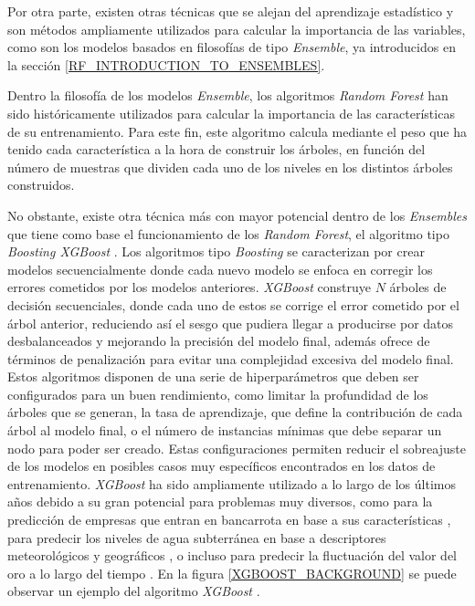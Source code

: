 
Por otra parte, existen otras técnicas que se alejan del aprendizaje estadístico y son métodos ampliamente utilizados para calcular la importancia de las variables, como son los modelos basados en filosofías de tipo \textit{Ensemble}, ya introducidos en la sección \ref{RF_INTRODUCTION_TO_ENSEMBLES}.

Dentro la filosofía de los modelos \textit{Ensemble}, los algoritmos \textit{Random Forest} han sido históricamente utilizados para calcular la importancia de las características de su entrenamiento. Para este fin, este algoritmo calcula mediante el peso que ha tenido cada característica a la hora de construir los árboles, en función del número de muestras que dividen cada uno de los niveles en los distintos árboles construidos.

No obstante, existe otra técnica más con mayor potencial dentro de los \textit{Ensembles} que tiene como base el funcionamiento de los \textit{Random Forest}, el algoritmo tipo \textit{Boosting XGBoost} \cite{Chen_2016}. Los algoritmos tipo \textit{Boosting} se caracterizan por crear modelos secuencialmente donde cada nuevo modelo se enfoca en corregir los errores cometidos por los modelos anteriores. \textit{XGBoost} construye $N$ árboles de decisión secuenciales, donde cada uno de estos se corrige el error cometido por el árbol anterior, reduciendo así el sesgo que pudiera llegar a producirse por datos desbalanceados y mejorando la precisión del modelo final, además ofrece de términos de penalización para evitar una complejidad excesiva del modelo final. Estos algoritmos disponen de una serie de hiperparámetros que deben ser configurados para un buen rendimiento, como limitar la profundidad de los árboles que se generan, la tasa de aprendizaje, que define la contribución de cada árbol al modelo final, o el número de instancias mínimas que debe separar un nodo para poder ser creado. Estas configuraciones permiten reducir el sobreajuste de los modelos en posibles casos muy específicos encontrados en los datos de entrenamiento. \textit{XGBoost} ha sido ampliamente utilizado a lo largo de los últimos años debido a su gran potencial para problemas muy diversos, como para la predicción de empresas que entran en bancarrota en base a sus características \cite{BenJabeur2023}, para predecir los niveles de agua subterránea en base a descriptores meteorológicos y geográficos \cite{IBRAHEMAHMEDOSMAN20211545}, o incluso para predecir la fluctuación del valor del oro a lo largo del tiempo \cite{Jabeur2021}. En la figura \ref{XGBOOST_BACKGROUND} se puede observar un ejemplo del algoritmo \textit{XGBoost} \cite{XGBOOST_IMAGE}.

